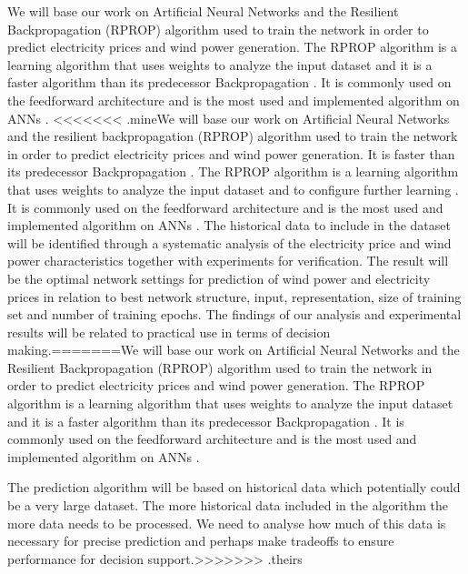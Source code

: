 We will base our work on Artificial Neural Networks and the Resilient Backpropagation (RPROP) algorithm used to train the network in order to predict electricity prices and wind power generation. The RPROP algorithm is a learning algorithm that uses weights to analyze the input dataset\cite{17} and it is a faster algorithm than its predecessor Backpropagation \cite{8,15}. It is commonly used on the feedforward architecture and is the most used and implemented algorithm on ANNs \cite{14,17}.
<<<<<<< .mineWe will base our work on Artificial Neural Networks and the resilient backpropagation (RPROP) algorithm used to train the network in order to predict electricity prices and wind power generation. It is faster than its predecessor Backpropagation \cite{8,15}.  The RPROP algorithm is a learning algorithm that uses weights to analyze the input dataset and to configure further learning \cite{17}. It is commonly used on the feedforward architecture and is the most used and implemented algorithm on ANNs \cite{14,17}. The historical data to include in the dataset will be identified through a systematic analysis of the electricity price and wind power characteristics together with experiments for verification. The result will be the optimal network settings for prediction of wind power and electricity prices in relation to best network structure, input, representation, size of training set and number of training epochs. The findings of our analysis and experimental results will be related to practical use in terms of decision making.=======We will base our work on Artificial Neural Networks and the Resilient Backpropagation (RPROP) algorithm used to train the network in order to predict electricity prices and wind power generation. The RPROP algorithm is a learning algorithm that uses weights to analyze the input dataset\cite{17} and it is a faster algorithm than its predecessor Backpropagation \cite{8,15}. It is commonly used on the feedforward architecture and is the most used and implemented algorithm on ANNs \cite{14,17}.

The prediction algorithm will be based on historical data which potentially could be a very large dataset. The more historical data included in the algorithm the more data needs to be processed. We need to analyse how much of this data is necessary for precise prediction and perhaps make tradeoffs to ensure performance for decision support.>>>>>>> .theirs